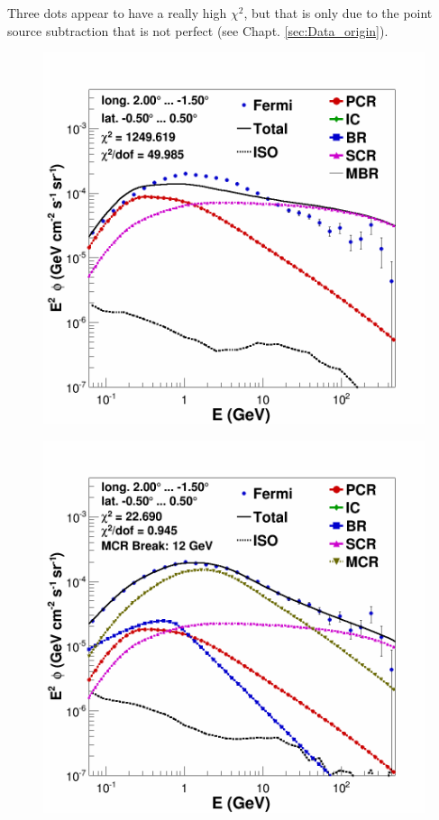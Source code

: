 Three dots appear to have a really high $\chi^2$, but that is only due to the point source subtraction that is not perfect (see Chapt. \ref{sec:Data_origin}).

\begin{figure}[h]
  \centering
  
  \begin{minipage}[h]{0.45\textwidth}
	  \centering
	  \includegraphics[width=\linewidth]{pic/results/SCRonly_CMZ.png}	  
	  \label{fig:SCRonly_CMZ}
  \end{minipage}
  \hfill
  \begin{minipage}[h]{0.45\textwidth}
	  \centering
	  \includegraphics[width=\linewidth]{pic/results/MCRonly_CMZ.png}
  	  \label{fig:MCRonly_CMZ}
  \end{minipage}
  \label{fig:MCR_vs_SCRonly_CMZ}
\end{figure}

